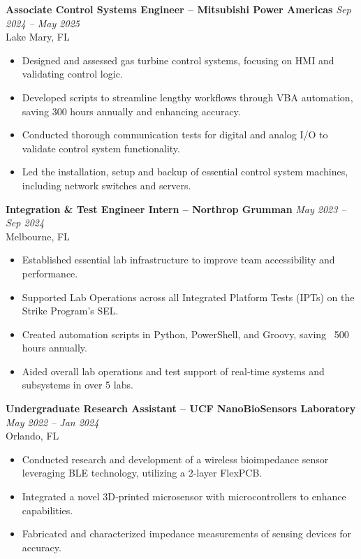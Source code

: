 \documentclass[9pt,letterpaper]{article}
\begin{document}
\textbf{Associate Control Systems Engineer -- Mitsubishi Power Americas} 
\hfill \textit{Sep 2024 -- May 2025}\\
Lake Mary, FL
\begin{itemize}
  \item Designed and assessed gas turbine control systems, focusing on HMI and validating control logic.
  \item Developed scripts to streamline lengthy workflows through VBA automation, saving 300 hours annually and enhancing accuracy.
  \item Conducted thorough communication tests for digital and analog I/O to validate control system functionality.
  \item  Led the installation, setup and backup of essential control system machines, including network switches and servers.
\end{itemize}

\textbf{Integration \& Test Engineer Intern -- Northrop Grumman}
\hfill \textit{May 2023 -- Sep 2024}\\
Melbourne, FL
\begin{itemize}
  \item Established essential lab infrastructure to improve team accessibility and performance.
  \item Supported Lab Operations across all Integrated Platform Tests (IPTs) on the Strike Program's SEL.
  \item Created automation scripts in Python, PowerShell, and Groovy, saving ~500 hours annually.
  \item Aided overall lab operations and test support of real‐time systems and subsystems in over 5 labs.
\end{itemize}

\textbf{Undergraduate Research Assistant -- UCF NanoBioSensors Laboratory}
\hfill \textit{May 2022 -- Jan 2024}\\
Orlando, FL
\begin{itemize}
  \item Conducted research and development of a wireless bioimpedance sensor leveraging BLE technology, utilizing a 2-layer FlexPCB.
  \item Integrated a novel 3D‐printed microsensor with microcontrollers to enhance capabilities.
  \item Fabricated and characterized impedance measurements of sensing devices for accuracy.
\end{itemize}
\end{document}
